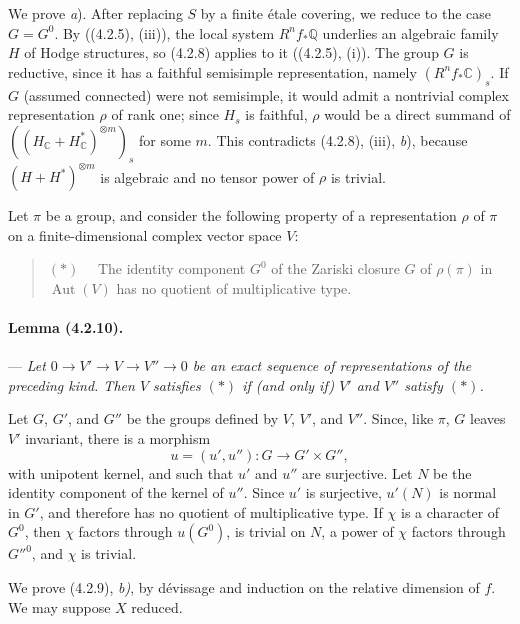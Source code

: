 \documentclass[10pt]{article}
\newcommand{\C}{\mathbb C}
\newcommand{\Q}{\mathbb Q}
\providecommand{\Aut}{\operatorname{Aut}}
\begin{document}
We prove \textit{a}). After replacing $S$ by a finite étale covering, we reduce to the case $G=G^0$. By ((4.2.5), (iii)), the local system $R^nf_*\Q$ underlies an algebraic family $H$ of Hodge structures, so (4.2.8) applies to it ((4.2.5), (i)). The group $G$ is reductive, since it has a faithful semisimple representation, namely $(R^nf_*\C)_s$. If $G$ (assumed connected) were not semisimple, it would admit a nontrivial complex representation $\rho$ of rank one; since $H_s$ is faithful, $\rho$ would be a direct summand of $((H_\C+H_\C^*)^{\otimes m})_s$ for some $m$. This contradicts (4.2.8), (iii), \textit{b}), because $(H+H^*)^{\otimes m}$ is algebraic and no tensor power of $\rho$ is trivial.

Let $\pi$ be a group, and consider the following property of a representation $\rho$ of $\pi$ on a finite-dimensional complex vector space $V$:
\begin{quote}
\noindent $(*)\quad$ The identity component $G^0$ of the Zariski closure $G$ of $\rho(\pi)$ in $\Aut(V)$ has no quotient of multiplicative type.
\end{quote}

\paragraph{Lemma (4.2.10).} --- {\itshape Let $0\to V'\to V\to V''\to0$ be an exact sequence of representations of the preceding kind. Then $V$ satisfies $(*)$ if (and only if) $V'$ and $V''$ satisfy $(*)$.}

Let $G$, $G'$, and $G''$ be the groups defined by $V$, $V'$, and $V''$. Since, like $\pi$, $G$ leaves $V'$ invariant, there is a morphism
\[
u=(u',u''):G\longrightarrow G'\times G'',
\]
with unipotent kernel, and such that $u'$ and $u''$ are surjective. Let $N$ be the identity component of the kernel of $u''$. Since $u'$ is surjective, $u'(N)$ is normal in $G'$, and therefore has no
quotient of multiplicative type. If $\chi$ is a character of $G^0$, then $\chi$ factors through $u(G^0)$, is trivial on $N$, a power of $\chi$ factors through $G''^0$, and $\chi$ is trivial.

We prove (4.2.9), \textit{b)}, by dévissage and induction on the relative dimension of $f$. We may suppose $X$ reduced.
\end{document}
